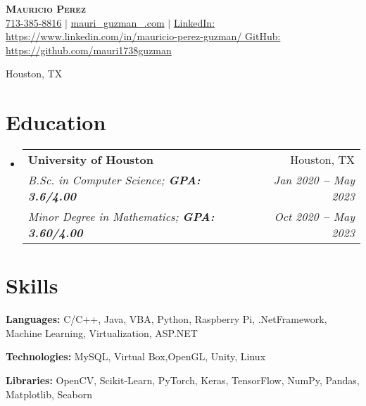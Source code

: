 \documentclass[letterpaper,11pt]{article}
\makeatletter
\newcommand{\resumeEducationHeading}[6]{
  \vspace{-2pt}\item
    \begin{tabular*}{0.97\textwidth}[t]{l@{\extracolsep{\fill}}r}
      \textbf{#1} & #2 \\
      \textit{\small#3} & \textit{\small #4} \\
      \textit{\small#5} & \textit{\small #6} \\
    \end{tabular*}\vspace{-5pt}
}
\newcommand{\resumeSubHeadingListStart}{\begin{itemize}[leftmargin=0.15in, label={}]}
\newcommand{\resumeSubHeadingListEnd}{\end{itemize}}
\makeatother
\begin{document}
\begin{center}
    \textbf{\Huge \scshape Mauricio Perez} \\ \vspace{3pt}
    \small
    \faMobile \hspace{.5pt} \href{tel:713-385-8816}{713-385-8816}
    $|$
   \faAt \hspace{.5pt} \href{mailto:mauri\_guzman\_\@outlook.com}{mauri\_guzman\_\@outlook.com}
    $|$
    \faLinkedinSquare \hspace{.5pt} \href{https://www.linkedin.com/in/mauricio-perez-guzman/}{LinkedIn: https://www.linkedin.com/in/mauricio-perez-guzman/ } \newline
    \faGithub \hspace{.5pt} \href{https://github.com/mauri1738guzman}{GitHub: https://github.com/mauri1738guzman }
  
    \faMapMarker \hspace{.5pt} {Houston, TX}
\end{center}




\section{Education}
  \vspace{3pt}
  \resumeSubHeadingListStart
    
    \resumeEducationHeading
      {University of Houston
      }{Houston, TX}
      {B.Sc. in Computer Science;   \textbf{GPA: 3.6/4.00}}{Jan 2020 \textbf{--} May 2023}
      {Minor Degree in Mathematics;
      \textbf{GPA: 3.60/4.00}}{Oct 2020 \textbf{--} May 2023}
      
  \resumeSubHeadingListEnd




\section{Skills}
  \vspace{2pt}
  \resumeSubHeadingListStart
    \small{\item{
        
        \textbf{Languages:}{ C/C++, Java, VBA, Python, Raspberry Pi,  .NetFramework, Machine Learning, Virtualization, ASP.NET} \\ \vspace{3pt}
        
        \textbf{Technologies:}{ MySQL, Virtual Box,OpenGL, Unity, Linux } \vspace{3pt}
        
        \textbf{Libraries:}{ OpenCV, Scikit-Learn, PyTorch, Keras, TensorFlow, NumPy, Pandas, Matplotlib, Seaborn} \\ \vspace{3pt}
        
    }}
  \resumeSubHeadingListEnd
\end{document}
